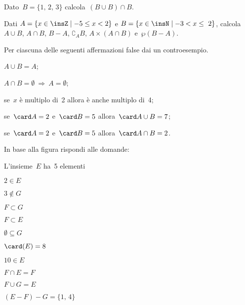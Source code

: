 \begin{esercizio}
\label{ese:\thechapter.111}
Dato~$B=\{\text{1, 2, 3}\}$ calcola~$(B\cup B)\cap B$.
\end{esercizio}

\begin{esercizio}
\label{ese:\thechapter.112}
Dati $A=\{x\in\insZ\mid -5\le x<2\}$ e $B=\{x\in\insN\mid -3<x\le~2\}$, calcola
$A\cup B$, $A\cap B$, $B-A$, $\complement_{A}B$, $A\times(A\cap B)$ e~$\wp (B-A)$.
\end{esercizio}

\begin{esercizio}
\label{ese:\thechapter.113}
Per ciascuna delle seguenti affermazioni false dai un controesempio.

\begin{enumeratea}
\item $A\cup B=A$;
\item $A\cap B=\emptyset\:\Rightarrow\:A=\emptyset $;
\item se~$x$ è multiplo di~2 allora è anche multiplo di~4;
\item se~$\card A =2$ e~$\card B = 5$ allora~$\card A\cup B=7$;
\item se~$\card A =2$ e~$\card B = 5$ allora~$\card A\cap B=2$.
\end{enumeratea}
\end{esercizio}

\begin{esercizio}
\label{ese:\thechapter.114}
In base alla figura rispondi alle domande:
\begin{multicols}{2}
\TabPositions{4.5cm}
\begin{enumeratea}
\item L'insieme~$E$ ha~5 elementi \tab\boxV\quad\boxF
\item $2\in E$ \tab\boxV\quad\boxF
\item $3\notin G$ \tab\boxV\quad\boxF
\item $F\subset G$ \tab\boxV\quad\boxF
\item $F\subset E$ \tab\boxV\quad\boxF
\item $\emptyset \subseteq G$ \tab\boxV\quad\boxF
\item $\card(E)=8$ \tab\boxV\quad\boxF
\item $10\in E$ \tab\boxV\quad\boxF
\item $F\cap E=F$ \tab\boxV\quad\boxF
\item $F\cup G=E$ \tab\boxV\quad\boxF
\item $(E-F)-G=\{\text{1, 4}\}$ \tab\boxV\quad\boxF
\end{enumeratea}
\begin{center}
 
\end{center}
\end{multicols}
\end{esercizio}

